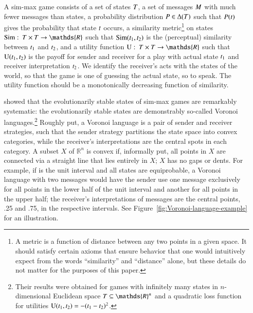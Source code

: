 \documentclass[fleqn,reqno,10pt]{article}
\newcommand{\similarity}{\ensuremath{\mathrm{Sim}}} %
\renewcommand{\Pr}{\ensuremath{P}}
\begin{document}
A sim-max game consists of a set of states $T$, a set of messages $M$ with much
fewer messages than states, a probability distribution $\Pr \in \Delta(\States)$ such that
$\Pr(\state)$ gives the probability that state $t$ occurs, a similarity metric\footnote{A
  metric is a function of distance between any two points in a given space. It should satisfy
  certain axioms that ensure behavior that one would intuitively expect from the words
  ``similarity'' and ``distance'' alone, but these details do not matter for the purposes of
  this paper.}
on states $\similarity \mycolon \States \times \States \rightarrow \mathds{R}$ such that
$\similarity(\mystate{1}, \mystate{2})$ is the (perceptual) similarity between $t_{\mathrm{1}}$
and $t_{\mathrm{2}}$, and a utility function $\Utils \mycolon \States \times \States \rightarrow
\mathds{R}$ such that $\mathrm{U}(t_{\mathrm{1}}, t_{\mathrm{2}})$ is the payoff for sender and receiver
for a play with actual state $t_{\mathrm{1}}$ and receiver interpretation $t_{\mathrm{2}}$. We
identify the receiver's acts with the states of the world, so that the game is one of guessing
the actual state, so to speak. The utility function should be a monotonically decreasing
function of similarity.

\citet{JagerMetzger2011:Voronoi-Languag} showed that the evolutionarily stable states of
sim-max games are remarkably systematic: the evolutionarily stable states are demonstrably
so-called Voronoi languages.\footnote{Their results were obtained for games with infinitely
  many states in $n$-dimensional Euclidean space $\States \subseteq \mathds{R}^n$ and a
  quadratic loss function for utilities
  $\mathrm{U}(t_{\mathrm{1}}, t_{\mathrm{2}}) = - (t_{\mathrm{1}} - t_{\mathrm{2}})^2$.} Roughly put, a Voronoi
language is a pair of sender and receiver strategies, such that the sender strategy partitions
the state space into convex categories, while the receiver's interpretations are the central
spots in each category. A subset $X$ of $\mathds{R}^n$ is convex if, informally put, all points
in $X$ are connected via a straight line that lies entirely in $X$; $X$ has no gaps or
dents. For example, if \States is the unit interval and all states are equiprobable, a Voronoi
language with two messages would have the sender use one message exclusively for all points in
the lower half of the unit interval and another for all points in the upper half; the
receiver's interpretations of messages are the central points, .25 and .75, in the respective
intervals.  See Figure~\ref{fig:Voronoi-language-example} for an illustration.
\end{document}
